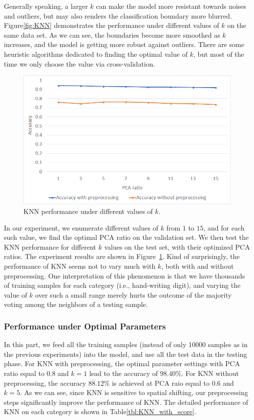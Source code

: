 \documentclass{article}
\begin{document}
Generally speaking, a larger $k$ can make the model more resistant towards noises and outliers, but may also renders the classification boundary more blurred. Figure\ref{fig:KNN} demonstrates the performance under different values of $k$ on the same data set. As we can see, the boundaries become more smoothed as $k$ increases, and the model is getting more robust against outliers. There are some heuristic algorithms dedicated to finding the optimal value of $k$, but most of the time we only choose the value via cross-validation. 

\begin{figure}[!htb]
	\centering\includegraphics[width=.8\textwidth]{fig/KNN_K}
	\caption{KNN performance under different values of $k$.}\label{fig:KNN_K}
\end{figure}


In our experiment, we enumerate different values of $k$ from $1$ to $15$, and for each such value, we find the optimal PCA ratio on the validation set. We then test the KNN performance for different $k$ values on the test set, with their optimized PCA ratios. The experiment results are shown in Figure~\ref{fig:KNN_K}. Kind of surprisingly, the performance of KNN seems not to vary much with $k$, both with and without preprocessing. One interpretation of this phenomenon is that we have thousands of training samples for each category (i.e., hand-writing digit), and varying the value of $k$ over such a small range merely hurts the outcome of the majority voting among the neighbors of a testing sample. 


\subsubsection{Performance under Optimal Parameters}
In this part, we feed all the training samples (instead of only 10000 samples as in the previous experiments) into the model, and use all the test data in the testing phase. For KNN with preprocessing, the optimal parameter settings with PCA ratio equal to $0.8$ and $k=1$ lead to the accuracy of $98.40\%$. For KNN without preprocessing, the accuracy $88.12\%$ is achieved at PCA raio equal to $0.6$ and $k=5$. As we can see, since KNN is sensitive to spatial shifting, our preprocessing steps significantly improve the performance of KNN. The detailed performance of KNN on each category is shown in Table\ref{tbl:KNN_with_score}.
\end{document}
